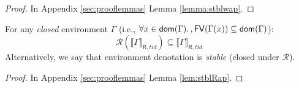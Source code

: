 \begin{proof}
In Appendix \ref{sec:prooflemmas} Lemma \ref{lemma:stblwap}.
\end{proof}
\begin{lemma}
For any \emph{closed} environment $\Gamma$ (i.e., $\forall x\in\mathsf{dom}(\Gamma)\ldotp, \mathsf{FV}(\Gamma(x))\subseteq\mathsf{dom}(\Gamma)$):
\[
\mathcal{R}(\llbracket\Gamma\rrbracket_{\mathsf{R},tid})\subseteq\llbracket\Gamma\rrbracket_{\mathsf{R},tid}
\]
Alternatively, we say that environment denotation is \emph{stable} (closed under $\mathcal{R}$).
\end{lemma}
\begin{proof}
In Appendix \ref{sec:prooflemmas} Lemma \ref{lem:stblRap}.
\end{proof}

